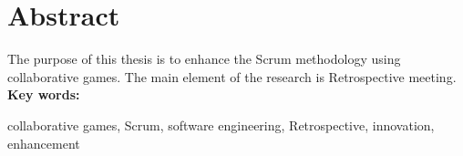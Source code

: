 \chapter*{Abstract}

The purpose of this thesis is to enhance the Scrum methodology using collaborative games. The main element of the research is Retrospective meeting. 
\vspace{12pt}
\noindent\textbf{Key words:}

\vspace{6pt}
\noindent collaborative games, Scrum, software engineering, Retrospective, innovation, enhancement
